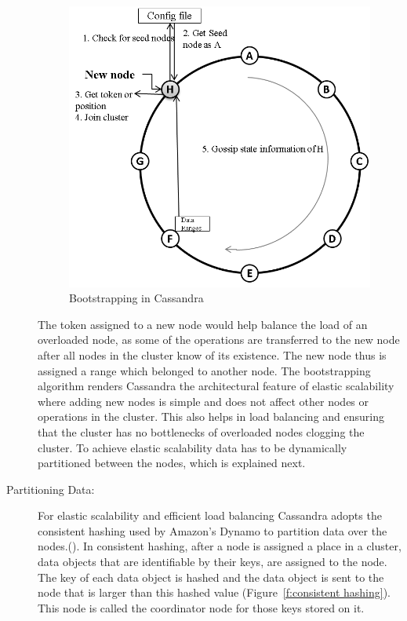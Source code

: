 \begin{description}
\newpage

\begin{figure}[H]
	\centering
	\includegraphics[width=.6\textwidth]{./figure/Cassandra/Bootstrapping.png}
	\caption{Bootstrapping in Cassandra}\label{f:bootstrap}
\end{figure}

The token assigned to a new node would help balance the load of an overloaded
node, as some of the operations are transferred to the new node after all nodes
in the cluster know of its existence.  The new node thus is assigned a range
which belonged to another node. The bootstrapping algorithm renders Cassandra
the architectural feature of elastic scalability where adding new nodes is
simple and does not affect other nodes or operations in the cluster. This also
helps in load balancing and ensuring that the cluster has no bottlenecks of
overloaded nodes clogging the cluster. To achieve elastic scalability data has
to be dynamically partitioned between the nodes, which is explained next.

\item[Partitioning Data:] For  elastic scalability and efficient load balancing
Cassandra adopts the consistent hashing used by Amazon's Dynamo to partition
data over the nodes.(). In consistent hashing, after
a node is assigned a place in a cluster, data objects that are identifiable by
their keys, are assigned to the node. The key of each data object is hashed and
the data object is sent to the node that is larger than this hashed value
(Figure~\ref{f:consistent hashing}). 
This node is called the coordinator node
for those keys stored on it.


\end{description}
